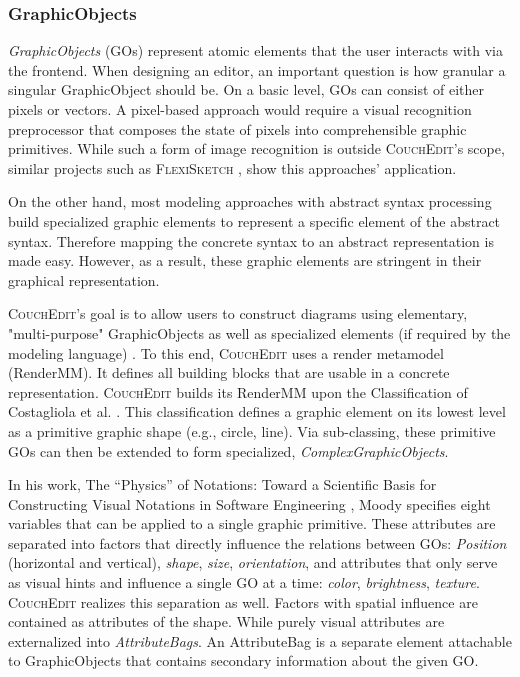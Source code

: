 \subsubsection{GraphicObjects}
\emph{GraphicObjects} (GOs) represent atomic elements that the user interacts with via the frontend. When designing an editor, an important question is how granular a singular GraphicObject should be. On a basic level, GOs can consist of either pixels or vectors. A pixel-based approach would require a visual recognition preprocessor that composes the state of pixels into comprehensible graphic primitives. While such a form of image recognition is outside \textsc{CouchEdit}'s scope, similar projects such as \textsc{FlexiSketch} \cite{wuest_flexisketch_2015}, show this approaches' application.

On the other hand, most modeling approaches with abstract syntax processing build specialized graphic elements to represent a specific element of the abstract syntax. Therefore mapping the concrete syntax to an abstract representation is made easy. However, as a result, these graphic elements are stringent in their graphical representation.

\textsc{CouchEdit}'s goal is to allow users to construct diagrams using elementary, "multi-purpose" GraphicObjects as well as specialized elements (if required by the modeling language) \cite{nachreiner_couchedit_2020}. To this end, \textsc{CouchEdit} uses a render metamodel (RenderMM). It defines all building blocks that are usable in a concrete representation. \textsc{CouchEdit} builds its RenderMM upon the Classification of Costagliola et al. \cite{costagliola_classification_2002}. This classification defines a graphic element on its lowest level as a primitive graphic shape (e.g., circle, line). Via sub-classing, these primitive GOs can then be extended to form specialized, \emph{ComplexGraphicObjects}.

In his work, The “Physics” of Notations: Toward a Scientific Basis for Constructing Visual Notations in Software Engineering \cite{moody_physics_2009}, Moody specifies eight variables that can be applied to a single graphic primitive. These attributes are separated into factors that directly influence the relations between GOs:  \emph{Position} (horizontal and vertical), \emph{shape}, \emph{size}, \emph{orientation}, and attributes that only serve as visual hints and influence a single GO at a time: \emph{color}, \emph{brightness}, \emph{texture}. \textsc{CouchEdit} realizes this separation as well. Factors with spatial influence are contained as attributes of the shape. While purely visual attributes are externalized into \emph{AttributeBags}. An AttributeBag is a separate element attachable to GraphicObjects that contains secondary information about the given GO.

